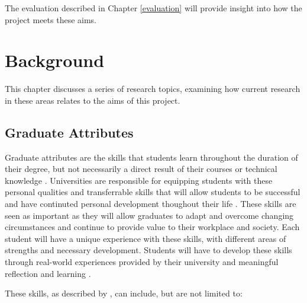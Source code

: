 \documentclass{l4proj}
\begin{document}
The evaluation described in Chapter \ref{evaluation} will provide insight into how the project meets these aims.


\chapter{Background} \label{Background}

This chapter discusses a series of research topics, examining how current research in these areas relates to the aims of this project.

\section{Graduate Attributes}

Graduate attributes are the skills that students learn throughout the duration of their degree, but not necessarily a direct result of their courses or technical knowledge \citep{glasgow_university_attributes}. Universities are responsible for equipping students with these personal qualities and transferrable skills that will allow students to be successful and have continuted personal development thoughout their life \citep{stirling_graduate_nodate}. These skills are seen as important as they will allow graduates to adapt and overcome changing circumstances and continue to provide value to their workplace and society. Each student will have a unique experience with these skills, with different areas of strengths and necessary development. Students will have to develop these skills through real-world experiences provided by their university and meaningful reflection and learning \citep{edinburgh_definition_skills}.

These skills, as described by \citet{litchfield_contextualising_2010, stevens_industry_2016, bruno_reflective_2018}, can include, but are not limited to:
\end{document}

